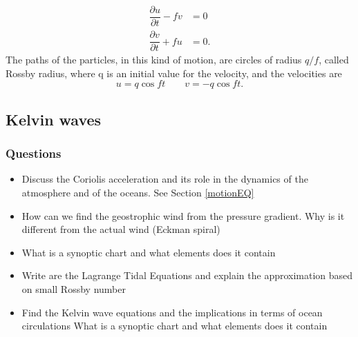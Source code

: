 \begin{align}
\dfrac{\partial u}{\partial t}-fv&=0\\
\dfrac{\partial v}{\partial t}+fu&=0.
\end{align}
The paths of the particles, in this kind of motion, are circles of radius $q/f$, called Rossby radius, where q is an initial value for the velocity, and the velocities are
\begin{equation*}
u=q\cos{ft} \qquad 
v=-q\cos{ft}.
\end{equation*}
\subsection{Kelvin waves}

\subsubsection*{Questions}
\begin{itemize}
\item Discuss the Coriolis acceleration and its role in the dynamics of the atmosphere and of the oceans. See Section \ref{motionEQ}
\item How can we find the geostrophic wind from the pressure gradient. Why is it different from the actual wind (Eckman spiral)
\item What is a synoptic chart and what elements does it contain
\item Write are the Lagrange Tidal Equations and explain the approximation based on small Rossby number
\item Find the Kelvin wave equations and the implications in terms of ocean circulations What is a synoptic chart and what elements does it contain
\end{itemize}

